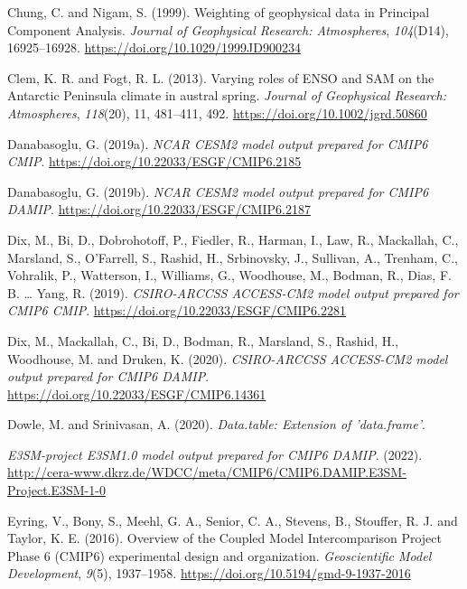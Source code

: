 \documentclass[12pt,oneside,a4paper]{reedthesis}
\newlength{\cslhangindent}
\newenvironment{CSLReferences}[2] %
 {%
  \setlength{\parindent}{0pt}
  \ifodd #1 \everypar{\setlength{\hangindent}{\cslhangindent}}\ignorespaces\fi
  \ifnum #2 > 0
  \setlength{\parskip}{#2\baselineskip}
  \fi
 }%
 {}
\begin{document}
\begin{CSLReferences}{1}{0}
\leavevmode{}%
Chung, C. and Nigam, S. (1999). Weighting of geophysical data in {Principal Component Analysis}. \emph{Journal of Geophysical Research: Atmospheres}, \emph{104}(D14), 16925--16928. \url{https://doi.org/10.1029/1999JD900234}

\leavevmode{}%
Clem, K. R. and Fogt, R. L. (2013). Varying roles of {ENSO} and {SAM} on the {Antarctic Peninsula} climate in austral spring. \emph{Journal of Geophysical Research: Atmospheres}, \emph{118}(20), 11, 481--411, 492. \url{https://doi.org/10.1002/jgrd.50860}

\leavevmode{}%
Danabasoglu, G. (2019a). \emph{NCAR CESM2 model output prepared for CMIP6 CMIP}. \url{https://doi.org/10.22033/ESGF/CMIP6.2185}

\leavevmode{}%
Danabasoglu, G. (2019b). \emph{NCAR CESM2 model output prepared for CMIP6 DAMIP}. \url{https://doi.org/10.22033/ESGF/CMIP6.2187}

\leavevmode{}%
Dix, M., Bi, D., Dobrohotoff, P., Fiedler, R., Harman, I., Law, R., Mackallah, C., Marsland, S., O'Farrell, S., Rashid, H., Srbinovsky, J., Sullivan, A., Trenham, C., Vohralik, P., Watterson, I., Williams, G., Woodhouse, M., Bodman, R., Dias, F. B. \ldots{} Yang, R. (2019). \emph{CSIRO-ARCCSS ACCESS-CM2 model output prepared for CMIP6 CMIP}. \url{https://doi.org/10.22033/ESGF/CMIP6.2281}

\leavevmode{}%
Dix, M., Mackallah, C., Bi, D., Bodman, R., Marsland, S., Rashid, H., Woodhouse, M. and Druken, K. (2020). \emph{CSIRO-ARCCSS ACCESS-CM2 model output prepared for CMIP6 DAMIP}. \url{https://doi.org/10.22033/ESGF/CMIP6.14361}

\leavevmode{}%
Dowle, M. and Srinivasan, A. (2020). \emph{Data.table: {Extension} of 'data.frame'}.

\leavevmode{}%
\emph{E3SM-project E3SM1.0 model output prepared for CMIP6 DAMIP}. (2022). \url{http://cera-www.dkrz.de/WDCC/meta/CMIP6/CMIP6.DAMIP.E3SM-Project.E3SM-1-0}

\leavevmode{}%
Eyring, V., Bony, S., Meehl, G. A., Senior, C. A., Stevens, B., Stouffer, R. J. and Taylor, K. E. (2016). Overview of the {Coupled Model Intercomparison Project Phase} 6 ({CMIP6}) experimental design and organization. \emph{Geoscientific Model Development}, \emph{9}(5), 1937--1958. \url{https://doi.org/10.5194/gmd-9-1937-2016}


\end{CSLReferences}
\end{document}
